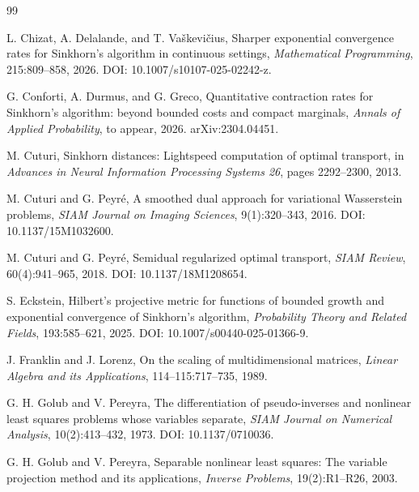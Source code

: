 \documentclass[11pt]{article}
\theoremstyle{definition}
\theoremstyle{remark}
\begin{document}
\begin{thebibliography}{99}

L. Chizat, A. Delalande, and T. Va\v{s}kevi\v{c}ius,
\newblock Sharper exponential convergence rates for Sinkhorn's
algorithm in continuous settings,
\newblock \emph{Mathematical Programming}, 215:809--858, 2026.
\newblock DOI: 10.1007/s10107-025-02242-z.

G. Conforti, A. Durmus, and G. Greco,
\newblock Quantitative contraction rates for Sinkhorn's algorithm:
beyond bounded costs and compact marginals,
\newblock \emph{Annals of Applied Probability}, to appear, 2026.
\newblock arXiv:2304.04451.

M. Cuturi,
\newblock Sinkhorn distances: Lightspeed computation of optimal
transport,
\newblock in \emph{Advances in Neural Information Processing Systems
26}, pages 2292--2300, 2013.

M. Cuturi and G. Peyr\'e,
\newblock A smoothed dual approach for variational Wasserstein
problems,
\newblock \emph{SIAM Journal on Imaging Sciences},
9(1):320--343, 2016.
\newblock DOI: 10.1137/15M1032600.

M. Cuturi and G. Peyr\'e,
\newblock Semidual regularized optimal transport,
\newblock \emph{SIAM Review}, 60(4):941--965, 2018.
\newblock DOI: 10.1137/18M1208654.

S. Eckstein,
\newblock Hilbert's projective metric for functions of bounded growth
and exponential convergence of Sinkhorn's algorithm,
\newblock \emph{Probability Theory and Related Fields},
193:585--621, 2025.
\newblock DOI: 10.1007/s00440-025-01366-9.

J. Franklin and J. Lorenz,
\newblock On the scaling of multidimensional matrices,
\newblock \emph{Linear Algebra and its Applications},
114--115:717--735, 1989.

G. H. Golub and V. Pereyra,
\newblock The differentiation of pseudo-inverses and nonlinear least
squares problems whose variables separate,
\newblock \emph{SIAM Journal on Numerical Analysis},
10(2):413--432, 1973.
\newblock DOI: 10.1137/0710036.

G. H. Golub and V. Pereyra,
\newblock Separable nonlinear least squares: The variable projection
method and its applications,
\newblock \emph{Inverse Problems}, 19(2):R1--R26, 2003.


\end{thebibliography}
\end{document}
